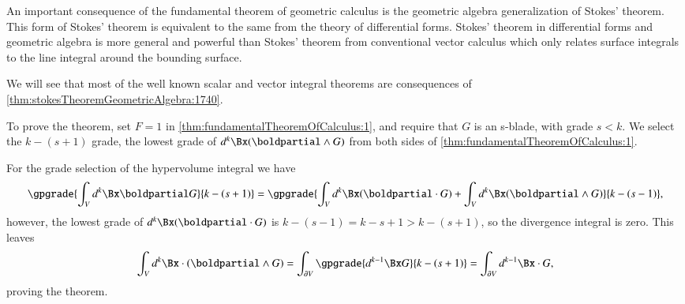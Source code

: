 %
%
An important consequence of the fundamental theorem of geometric calculus is the
geometric algebra generalization of Stokes' theorem.  This form of Stokes' theorem is equivalent to the same from the theory of differential forms.
Stokes' theorem in differential forms and geometric algebra is more general and powerful than Stokes' theorem from conventional vector calculus which only relates
surface integrals to the line integral around the bounding surface.


We will see that most of the well known scalar and vector integral theorems are consequences of \cref{thm:stokesTheoremGeometricAlgebra:1740}.

To prove the theorem, set \( F = 1 \) in \cref{thm:fundamentalTheoremOfCalculus:1}, and require that \( G \) is an s-blade, with grade \( s < k \).  We select the \( k-(s+1) \) grade, the lowest grade of \( d^k \Bx (\boldpartial \wedge G) \) from
both sides of
\cref{thm:fundamentalTheoremOfCalculus:1}.

For the grade selection of the hypervolume integral we have
\begin{dmath}\label{eqn:stokesTheoremTheStatement:n}
\gpgrade{ \int_V d^k \Bx \boldpartial G }{k-(s+1)}
=
\gpgrade{
\int_V d^k \Bx (\boldpartial \cdot G )
+
\int_V d^k \Bx (\boldpartial \wedge G )
}{k-(s-1)},
\end{dmath}
however, the lowest grade of \( d^k \Bx (\boldpartial \cdot G ) \) is \( k -(s-1) = k - s + 1 > k - (s+1) \), so the divergence integral is zero.  This leaves
\begin{dmath}\label{eqn:stokesTheoremTheStatement:n}
\int_V d^k \Bx \cdot (\boldpartial \wedge G )
= \int_{\partial V} \gpgrade{d^{k-1} \Bx G}{k-(s+1)}
= \int_{\partial V} d^{k-1} \Bx \cdot G,
\end{dmath}
proving the theorem.

